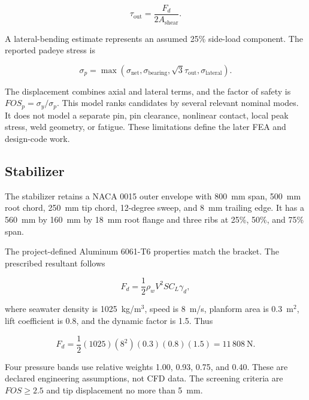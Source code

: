\begin{equation}
\tau_{\mathrm{out}}=
\frac{F_d}{2A_{\mathrm{shear}}}.
\label{eq:padeye-shearout}
\end{equation}

A lateral-bending estimate represents an assumed 25\% side-load component.
The reported padeye stress is

\begin{equation}
\sigma_p=\max\left(
\sigma_{\mathrm{net}},
\sigma_{\mathrm{bearing}},
\sqrt{3}\tau_{\mathrm{out}},
\sigma_{\mathrm{lateral}}
\right).
\label{eq:padeye-governing-stress}
\end{equation}

The displacement combines axial and lateral terms, and the factor of safety is
$FOS_p=\sigma_y/\sigma_p$. This model ranks candidates by several relevant
nominal modes. It does not model a separate pin, pin clearance, nonlinear
contact, local peak stress, weld geometry, or fatigue. These limitations
define the later FEA and design-code work.

\subsection{Stabilizer}
\label{sec:stabilizer-definition}

The stabilizer retains a NACA 0015 outer envelope with 800~mm span, 500~mm root
chord, 250~mm tip chord, 12-degree sweep, and 8~mm trailing edge. It has a
560~mm by 160~mm by 18~mm root flange and three ribs at 25\%, 50\%, and 75\%
span.

The project-defined Aluminum 6061-T6 properties match the bracket. The
prescribed resultant follows

\begin{equation}
F_d=\frac{1}{2}\rho_wV^2SC_L\gamma_d,
\label{eq:stabilizer-load-general}
\end{equation}

where seawater density is 1025~kg/m$^3$, speed is 8~m/s, planform area is
0.3~m$^2$, lift coefficient is 0.8, and the dynamic factor is 1.5. Thus

\begin{equation}
F_d=
\frac{1}{2}(1025)(8^2)(0.3)(0.8)(1.5)
=11\,808~\mathrm{N}.
\label{eq:stabilizer-load}
\end{equation}

Four pressure bands use relative weights 1.00, 0.93, 0.75, and 0.40. These are
declared engineering assumptions, not CFD data. The screening criteria are
$FOS\geq2.5$ and tip displacement no more than 5~mm.

